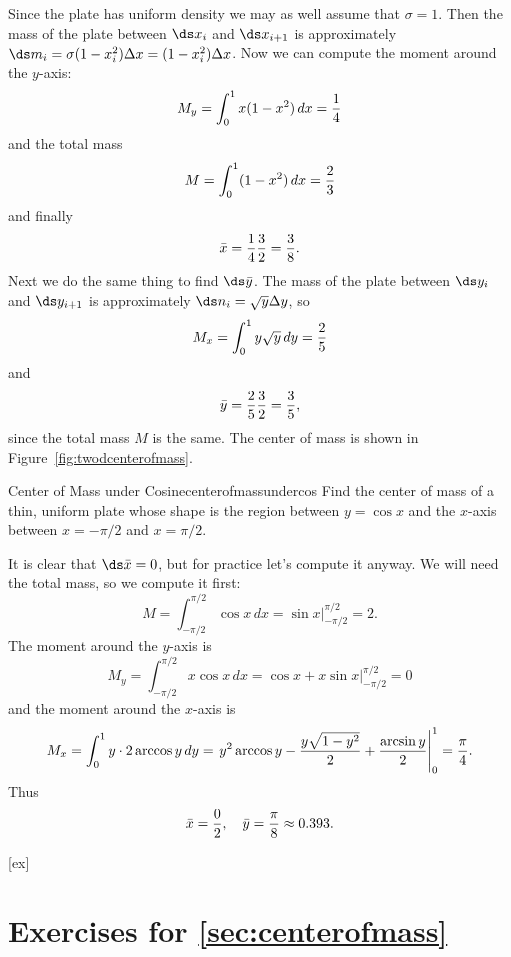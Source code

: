 \begin{solution}
Since the plate has uniform density we may as well assume that
$\sigma=1$. Then the mass of the plate between $\ds x_i$ and $\ds
x_{i+1}$ is approximately $\ds m_i=\sigma(1-x_i^2)\Delta
x=(1-x_i^2)\Delta x$. Now we can compute the moment around the
$y$-axis:
\[M_y=\int_0^1 x(1-x^2)\,dx={1\over4}\]
and the total mass 
\[M=\int_0^1 (1-x^2)\,dx={2\over3}\]
and finally
\[\bar x = {1\over4}{3\over2}={3\over8}.\]
Next we do the same thing to find $\ds \bar y$. The mass of the plate
between $\ds y_i$ and $\ds y_{i+1}$ is approximately $\ds
n_i=\sqrt{y}\Delta y$, so
\[M_x=\int_0^1 y\sqrt{y}\,dy={2\over5}\]
and
\[\bar y={2\over5}{3\over2}={3\over5},\]
since the total mass $M$ is the same. The center of mass is shown in
Figure~\ref{fig:twodcenterofmass}.  
\end{solution}

\begin{example}{Center of Mass under Cosine}{centerofmassundercos}
Find the center of mass of a thin, uniform plate whose shape
is the region between $y=\cos x$ and the $x$-axis between $x=-\pi/2$
and $x=\pi/2$.
\end{example}
\begin{solution}
It is clear that $\ds \bar x=0$, but for practice let's
compute it anyway. We will need the total mass, so we compute it
first:
\[M=\int_{-\pi/2}^{\pi/2} \cos x\,dx=\sin x\Big|_{-\pi/2}^{\pi/2}=2.\]
The moment around the $y$-axis is
\[M_y=\int_{-\pi/2}^{\pi/2} x\cos x\,dx=\cos x+x\sin x\Big|_{-\pi/2}^{\pi/2}=0\]
and the moment around the $x$-axis is
\[M_x=\int_{0}^{1} y\cdot2\arccos y\,dy=\left.y^2\arccos y-{y\sqrt{1-y^2}\over2}+{\arcsin y\over 2}\right|_{0}^{1}={\pi\over4}.\]
Thus
\[\bar x={0\over2},\quad \bar y={\pi\over8}\approx 0.393.\]
\end{solution}


[ex]
\section*{Exercises for \ref{sec:centerofmass}}

